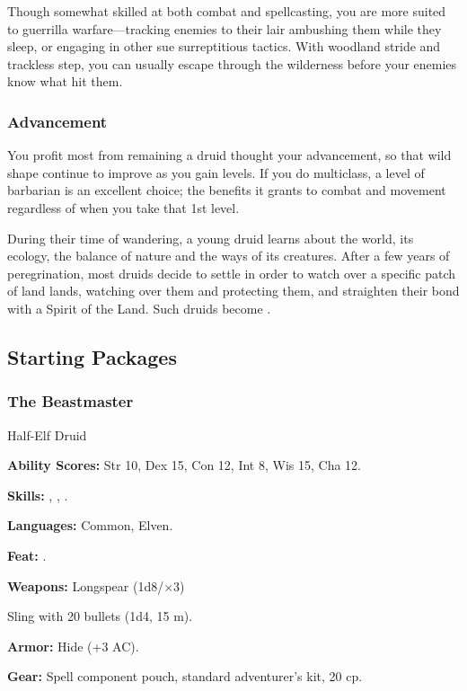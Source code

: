 Though somewhat skilled at both combat and spellcasting, you are more suited to guerrilla warfare---tracking enemies to their lair ambushing them while they sleep, or engaging in other sue surreptitious tactics. With woodland stride and trackless step, you can usually escape through the wilderness before your enemies know what hit them.

\subsubsection{Advancement}

You profit most from remaining a druid thought your advancement, so that %
wild shape continue to improve as you gain levels. If you do multiclass, a level of barbarian is an excellent choice; the benefits it grants to combat and movement regardless of when you take that 1st level.

During their time of wandering, a young druid learns about the world, its ecology, the balance of nature and the ways of its creatures. After a few years of peregrination, most druids decide to settle in order to watch over a specific patch of land lands, watching over them and protecting them, and straighten their bond with a Spirit of the Land. Such druids become .

\subsection{Starting Packages}
\subsubsection{The Beastmaster}

Half-Elf Druid

\textbf{Ability Scores:} Str 10, Dex 15, Con 12, Int 8, Wis 15, Cha 12.

\textbf{Skills:} , , .

\textbf{Languages:} Common, Elven.

\textbf{Feat:} .

\textbf{Weapons:} Longspear (1d8/$\times$3)

Sling with 20 bullets (1d4, 15 m).

\textbf{Armor:} Hide (+3 AC).

\textbf{Gear:} Spell component pouch, standard adventurer's kit, 20 cp.


